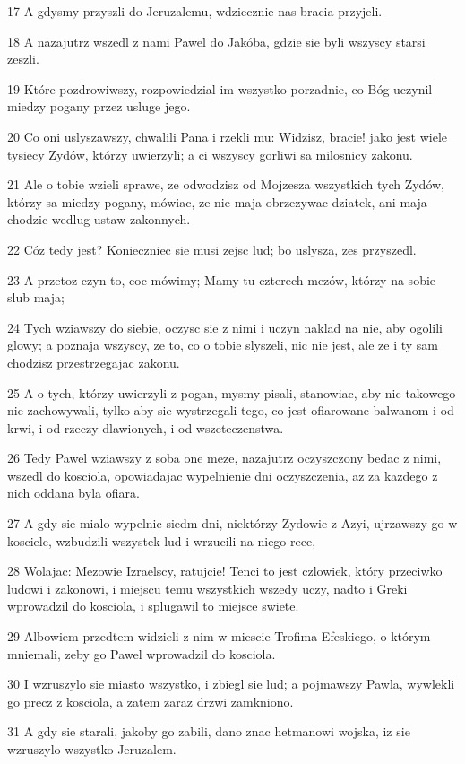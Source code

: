 \par 17 A gdysmy przyszli do Jeruzalemu, wdziecznie nas bracia przyjeli.
\par 18 A nazajutrz wszedl z nami Pawel do Jakóba, gdzie sie byli wszyscy starsi zeszli.
\par 19 Które pozdrowiwszy, rozpowiedzial im wszystko porzadnie, co Bóg uczynil miedzy pogany przez usluge jego.
\par 20 Co oni uslyszawszy, chwalili Pana i rzekli mu: Widzisz, bracie! jako jest wiele tysiecy Zydów, którzy uwierzyli; a ci wszyscy gorliwi sa milosnicy zakonu.
\par 21 Ale o tobie wzieli sprawe, ze odwodzisz od Mojzesza wszystkich tych Zydów, którzy sa miedzy pogany, mówiac, ze nie maja obrzezywac dziatek, ani maja chodzic wedlug ustaw zakonnych.
\par 22 Cóz tedy jest? Konieczniec sie musi zejsc lud; bo uslysza, zes przyszedl.
\par 23 A przetoz czyn to, coc mówimy; Mamy tu czterech mezów, którzy na sobie slub maja;
\par 24 Tych wziawszy do siebie, oczysc sie z nimi i uczyn naklad na nie, aby ogolili glowy; a poznaja wszyscy, ze to, co o tobie slyszeli, nic nie jest, ale ze i ty sam chodzisz przestrzegajac zakonu.
\par 25 A o tych, którzy uwierzyli z pogan, mysmy pisali, stanowiac, aby nic takowego nie zachowywali, tylko aby sie wystrzegali tego, co jest ofiarowane balwanom i od krwi, i od rzeczy dlawionych, i od wszeteczenstwa.
\par 26 Tedy Pawel wziawszy z soba one meze, nazajutrz oczyszczony bedac z nimi, wszedl do kosciola, opowiadajac wypelnienie dni oczyszczenia, az za kazdego z nich oddana byla ofiara.
\par 27 A gdy sie mialo wypelnic siedm dni, niektórzy Zydowie z Azyi, ujrzawszy go w kosciele, wzbudzili wszystek lud i wrzucili na niego rece,
\par 28 Wolajac: Mezowie Izraelscy, ratujcie! Tenci to jest czlowiek, który przeciwko ludowi i zakonowi, i miejscu temu wszystkich wszedy uczy, nadto i Greki wprowadzil do kosciola, i splugawil to miejsce swiete.
\par 29 Albowiem przedtem widzieli z nim w miescie Trofima Efeskiego, o którym mniemali, zeby go Pawel wprowadzil do kosciola.
\par 30 I wzruszylo sie miasto wszystko, i zbiegl sie lud; a pojmawszy Pawla, wywlekli go precz z kosciola, a zatem zaraz drzwi zamkniono.
\par 31 A gdy sie starali, jakoby go zabili, dano znac hetmanowi wojska, iz sie wzruszylo wszystko Jeruzalem.

